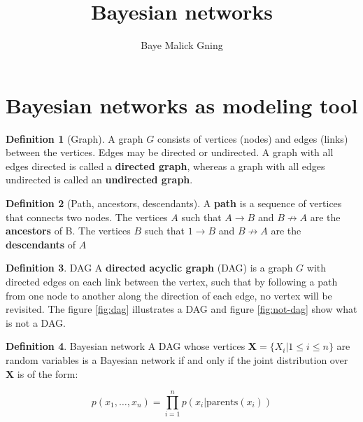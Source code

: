 \documentclass[12pt, a4paper]{article}
\author{Baye Malick Gning}
\date{}
\title{Bayesian networks}
\theoremstyle{definition}
\newtheorem{definition}{Definition}[section]
\numberwithin{figure}{section}
\numberwithin{equation}{section}
\numberwithin{table}{section}
\begin{document}
\maketitle
\vspace{2cm}


\newpage
\tableofcontents
\newpage


\section{Bayesian networks as modeling tool}

\begin{definition}[Graph]
A graph $G$ consists of vertices (nodes) and edges (links) between the vertices. Edges may be directed or undirected. A graph with all edges directed is called a \textbf{directed graph}, whereas a graph with all edges undirected is called an \textbf{undirected graph}.\\
\end{definition}

\begin{definition}[Path, ancestors, descendants]
A \textbf{path} is a sequence of vertices that connects two nodes. The vertices $A$ such that $A \to B$ and $B\not\to A$ are the \textbf{ancestors} of B. The vertices $B$ such that $1 \to B$ and $B \not\to A$ are the \textbf{descendants} of $A$\\
\end{definition}

\begin{definition}{DAG}
A \textbf{directed acyclic graph} (DAG) is a graph $G$ with directed edges on each link between the vertex, such that by following a path from one node to another along the direction of each edge, no vertex will be revisited. The figure \ref{fig:dag} illustrates a DAG and figure \ref{fig:not-dag} show what is not a DAG.
\end{definition}


\begin{definition}{Bayesian network}
A DAG whose vertices $\mathbf{X} = \{X_i | 1 \leq i \leq n\}$ are random variables is a Bayesian network if and only if the joint distribution over $\mathbf{X}$ is of the form:

\begin{equation}
p(x_1, \dots, x_n) = \prod_{i=1}^{n} p(x_i | \text{parents}(x_i))
\end{equation}

\end{definition}
\end{document}

